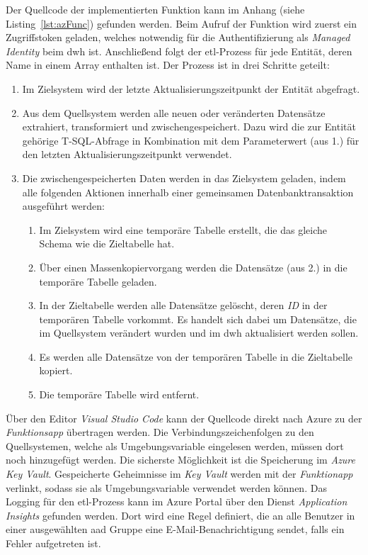 Der Quellcode der implementierten Funktion kann im Anhang (siehe Listing~\ref{lst:azFunc}) gefunden werden. Beim Aufruf der Funktion wird zuerst ein Zugriffstoken geladen, welches notwendig für die Authentifizierung als \textit{Managed Identity} beim \ac{dwh} ist. Anschließend folgt der \ac{etl}-Prozess für jede Entität, deren Name in einem Array enthalten ist. Der Prozess ist in drei Schritte geteilt:

\begin{enumerate}
\item Im Zielsystem wird der letzte Aktualisierungszeitpunkt der Entität abgefragt.
\item Aus dem Quellsystem werden alle neuen oder veränderten Datensätze extrahiert, transformiert und zwischengespeichert. Dazu wird die zur Entität gehörige T-SQL-Abfrage in Kombination mit dem Parameterwert (aus 1.) für den letzten Aktualisierungszeitpunkt verwendet.
\item Die zwischengespeicherten Daten werden in das Zielsystem geladen, indem alle folgenden Aktionen innerhalb einer gemeinsamen Datenbanktransaktion ausgeführt werden:
    \begin{enumerate}[label*=\arabic*.]
    \item Im Zielsystem wird eine temporäre Tabelle erstellt, die das gleiche Schema wie die Zieltabelle hat.
    \item Über einen Massenkopiervorgang werden die Datensätze (aus 2.) in die temporäre Tabelle geladen.
    \item In der Zieltabelle werden alle Datensätze gelöscht, deren \textit{ID} in der temporären Tabelle vorkommt. Es handelt sich dabei um Datensätze, die im Quellsystem verändert wurden und im \ac{dwh} aktualisiert werden sollen.
    \item Es werden alle Datensätze von der temporären Tabelle in die Zieltabelle kopiert.
    \item Die temporäre Tabelle wird entfernt.
    \end{enumerate}
\end{enumerate}

Über den Editor \textit{Visual Studio Code} kann der Quellcode direkt nach Azure zu der \textit{Funktionsapp} übertragen werden. Die Verbindungszeichenfolgen zu den Quellsystemen, welche als Umgebungsvariable eingelesen werden, müssen dort noch hinzugefügt werden. Die sicherste Möglichkeit ist die Speicherung im \textit{Azure Key Vault}. Gespeicherte Geheimnisse im \textit{Key Vault} werden mit der \textit{Funktionapp} verlinkt, sodass sie als Umgebungsvariable verwendet werden können. Das Logging für den \ac{etl}-Prozess kann im Azure Portal über den Dienst \textit{Application Insights} gefunden werden. Dort wird eine Regel definiert, die an alle Benutzer in einer ausgewählten \ac{aad} Gruppe eine E-Mail-Benachrichtigung sendet, falls ein Fehler aufgetreten ist.

